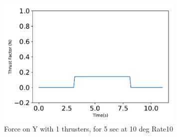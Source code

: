 \begin{figure}[htbp]\centerline{\includegraphics[width=0.8\textwidth]{AutoTeX/Force_1Thrusters_5s_10deg_Loc2_Rate10}}\caption{Force on Y with 1 thrusters, for 5 sec at 10 deg Rate10}\label{fig:Force_1Thrusters_5s_10deg_Loc2_Rate10}\end{figure}